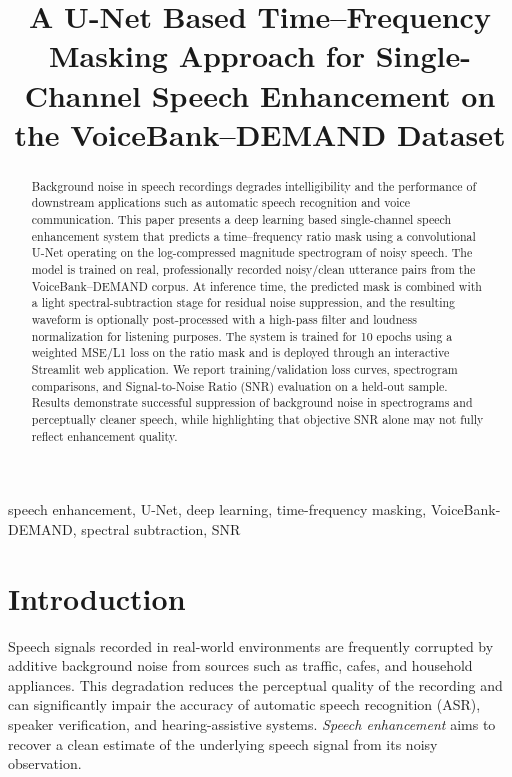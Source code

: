 \documentclass[conference]{IEEEtran}
\begin{document}
\title{A U-Net Based Time--Frequency Masking Approach for Single-Channel Speech Enhancement on the VoiceBank--DEMAND Dataset}

\author{
\and
{}
}

\maketitle

\begin{abstract}
Background noise in speech recordings degrades intelligibility and the performance of downstream applications such as automatic speech recognition and voice communication. This paper presents a deep learning based single-channel speech enhancement system that predicts a time--frequency ratio mask using a convolutional U-Net operating on the log-compressed magnitude spectrogram of noisy speech. The model is trained on real, professionally recorded noisy/clean utterance pairs from the VoiceBank--DEMAND corpus. At inference time, the predicted mask is combined with a light spectral-subtraction stage for residual noise suppression, and the resulting waveform is optionally post-processed with a high-pass filter and loudness normalization for listening purposes. The system is trained for 10 epochs using a weighted MSE/L1 loss on the ratio mask and is deployed through an interactive Streamlit web application. We report training/validation loss curves, spectrogram comparisons, and Signal-to-Noise Ratio (SNR) evaluation on a held-out sample. Results demonstrate successful suppression of background noise in spectrograms and perceptually cleaner speech, while highlighting that objective SNR alone may not fully reflect enhancement quality.
\end{abstract}

\begin{IEEEkeywords}
speech enhancement, U-Net, deep learning, time-frequency masking, VoiceBank-DEMAND, spectral subtraction, SNR
\end{IEEEkeywords}

\section{Introduction}
Speech signals recorded in real-world environments are frequently corrupted by additive background noise from sources such as traffic, cafes, and household appliances. This degradation reduces the perceptual quality of the recording and can significantly impair the accuracy of automatic speech recognition (ASR), speaker verification, and hearing-assistive systems. \emph{Speech enhancement} aims to recover a clean estimate of the underlying speech signal from its noisy observation.
\end{document}
